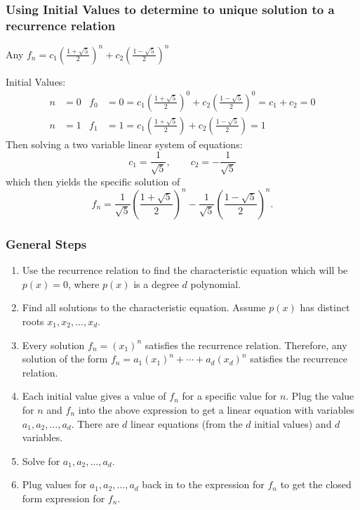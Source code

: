 \subsubsection*{Using Initial Values to determine to unique solution to a recurrence relation}
Any ${\displaystyle f_n = c_1\left(\frac{1 + \sqrt{5}}{2}\right)^n + c_2\left(\frac{1 - \sqrt{5}}{2}\right)^n}$

\noindent Initial Values:
\begin{align*}
  n & = 0 & f_0 & = 0 = c_1\left(\frac{1 + \sqrt{5}}{2}\right)^0 + c_2\left(\frac{1 - \sqrt{5}}{2}\right)^0 = c_1 + c_2 = 0 \\
  n & = 1 & f_1 & = 1 = c_1\left(\frac{1 + \sqrt{5}}{2}\right) + c_2\left(\frac{1 - \sqrt{5}}{2}\right) = 1
\end{align*}
Then solving a two variable linear system of equations:
\[
  c_1 = \frac{1}{\sqrt{5}}, \qquad c_2 = -\frac{1}{\sqrt{5}}
\]
which then yields the specific solution of
\[
  f_n = \frac{1}{\sqrt{5}}\left(\frac{1 + \sqrt{5}}{2}\right)^n - \frac{1}{\sqrt{5}}\left(\frac{1 - \sqrt{5}}{2}\right)^n.
\]

\subsubsection*{General Steps}
\begin{enumerate}
  \item Use the recurrence relation to find the characteristic equation which will be $p(x) = 0$, where $p(x)$ is a degree $d$ polynomial.
  \item Find all solutions to the characteristic equation. Assume $p(x)$ has distinct roots $x_1, x_2, \ldots, x_d$.
  \item Every solution $f_n = (x_1)^n$ satisfies the recurrence relation. Therefore, any solution of the form $f_n = a_1(x_1)^n + \cdots + a_d(x_d)^n$ satisfies the recurrence relation.
  \item Each initial value gives a value of $f_n$ for a specific value for $n$. Plug the value for $n$ and $f_n$ into the above expression to get a linear equation with variables $a_1,a_2,\ldots,a_d$. There are $d$ linear equations (from the $d$ initial values) and $d$ variables.
  \item Solve for $a_1,a_2,\ldots,a_d$.
  \item Plug values for $a_1,a_2,\ldots,a_d$ back in to the expression for $f_n$ to get the closed form expression for $f_n$.
\end{enumerate}

